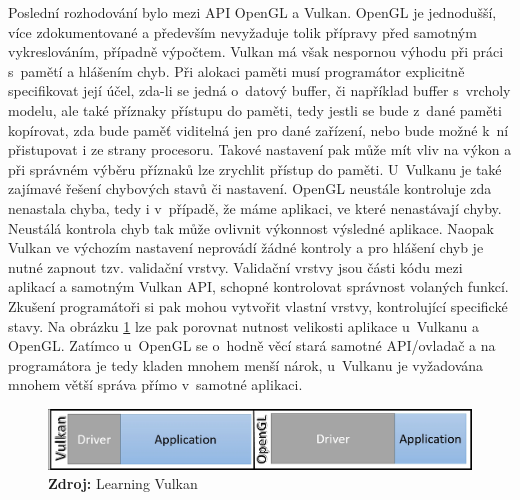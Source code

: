 Poslední rozhodování bylo mezi API OpenGL a Vulkan. OpenGL je jednodušší, více zdokumentované a především nevyžaduje tolik přípravy před samotným vykreslováním, případně výpočtem. Vulkan má však nespornou výhodu při práci s~pamětí a hlášením chyb. Při alokaci paměti musí programátor explicitně specifikovat její účel, zda-li se jedná o~datový buffer, či například buffer s~vrcholy modelu, ale také příznaky přístupu do paměti, tedy jestli se bude z~dané paměti kopírovat, zda bude paměť viditelná jen pro dané zařízení, nebo bude možné k~ní přistupovat i ze strany procesoru. Takové nastavení pak může mít vliv na výkon a při správném výběru příznaků lze zrychlit přístup do paměti. U~Vulkanu je také zajímavé řešení chybových stavů či nastavení. OpenGL neustále kontroluje zda nenastala chyba, tedy i v~případě, že máme aplikaci, ve které nenastávají chyby. Neustálá kontrola chyb tak může ovlivnit výkonnost výsledné aplikace. Naopak Vulkan ve výchozím nastavení neprovádí žádné kontroly a pro hlášení chyb je nutné zapnout tzv. validační vrstvy. Validační vrstvy jsou části kódu mezi aplikací a samotným Vulkan API, schopné kontrolovat správnost volaných funkcí. Zkušení programátoři si pak mohou vytvořit vlastní vrstvy, kontrolující specifické stavy. Na obrázku \ref{fig:VulXogl} lze pak porovnat nutnost velikosti aplikace u~Vulkanu a OpenGL. Zatímco u~OpenGL se o~hodně věcí stará samotné API/ovladač a na programátora je tedy kladen mnohem menší nárok, u~Vulkanu je vyžadována mnohem větší správa přímo v~samotné aplikaci. \cite{singh2016learning} \cite{VulkanTut}

\begin{figure}[hbt]
	\centering
	\captionsetup{justification=centering}
	\includegraphics[scale=0.5]{obrazky-figures/vulkanXogl.jpg}
	\textbf{Zdroj: } Learning Vulkan \cite{singh2016learning}
	\label{fig:VulXogl}
\end{figure}

